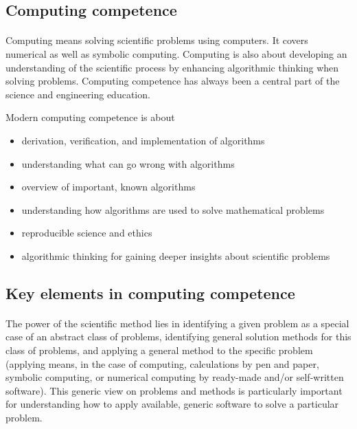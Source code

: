 \documentclass[%
oneside,                 %
final,                   %
10pt]{article}
\begin{document}
\subsection{Computing competence}

\paragraph{}
Computing means solving scientific problems using computers. It covers
numerical as well as symbolic computing. Computing is also about
developing an understanding of the scientific process by enhancing
algorithmic thinking when solving problems.  Computing competence has
always been a central part of the science and engineering
education.

Modern computing competence is about

\begin{itemize}
\item derivation, verification, and implementation of algorithms

\item understanding what can go wrong with algorithms

\item overview of important, known algorithms

\item understanding how algorithms are used to solve mathematical problems

\item reproducible science and ethics

\item algorithmic thinking for gaining deeper insights about scientific problems
\end{itemize}

\noindent



\subsection{Key elements in computing competence}

\paragraph{}
The power of the scientific method lies in identifying a given problem
as a special case of an abstract class of problems, identifying
general solution methods for this class of problems, and applying a
general method to the specific problem (applying means, in the case of
computing, calculations by pen and paper, symbolic computing, or
numerical computing by ready-made and/or self-written software). This
generic view on problems and methods is particularly important for
understanding how to apply available, generic software to solve a
particular problem.
\end{document}
